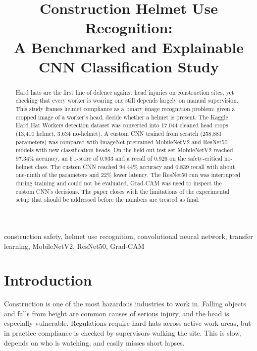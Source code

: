 \documentclass[conference]{IEEEtran}
\begin{document}
\title{Construction Helmet Use Recognition:\\ A Benchmarked and Explainable CNN Classification Study}

\author{
}

\maketitle

\begin{abstract}
Hard hats are the first line of defence against head injuries on construction sites, yet checking that every worker is wearing one still depends largely on manual supervision. This study frames helmet compliance as a binary image recognition problem: given a cropped image of a worker's head, decide whether a helmet is present. The Kaggle Hard Hat Workers detection dataset was converted into 17{,}044 cleaned head crops (13{,}410 helmet, 3{,}634 no-helmet). A custom CNN trained from scratch (258{,}881 parameters) was compared with ImageNet-pretrained MobileNetV2 and ResNet50 models with new classification heads. On the held-out test set MobileNetV2 reached 97.34\% accuracy, an F1-score of 0.933 and a recall of 0.926 on the safety-critical no-helmet class. The custom CNN reached 94.44\% accuracy and 0.839 recall with about one-ninth of the parameters and 22\% lower latency. The ResNet50 run was interrupted during training and could not be evaluated. Grad-CAM was used to inspect the custom CNN's decisions. The paper closes with the limitations of the experimental setup that should be addressed before the numbers are treated as final.
\end{abstract}

\begin{IEEEkeywords}
construction safety, helmet use recognition, convolutional neural network, transfer learning, MobileNetV2, ResNet50, Grad-CAM
\end{IEEEkeywords}

\section{Introduction}
Construction is one of the most hazardous industries to work in. Falling objects and falls from height are common causes of serious injury, and the head is especially vulnerable. Regulations require hard hats across active work areas, but in practice compliance is checked by supervisors walking the site. This is slow, depends on who is watching, and easily misses short lapses.
\end{document}
